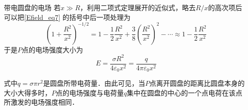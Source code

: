 \begin{example}{带电圆盘的电场}
若$x\gg R$，利用二项式定理展开的近似式，略去$R/x$的高次项后可以把\autoref{Efield_eq7} 的括号中后一项处理为
\begin{equation}
\left(1+\frac{R^{2}}{x^{2}}\right)^{-1 / 2}=1-\frac{1}{2} \frac{R^{2}}{x^{2}}+\frac{3}{8}\left(\frac{R^{2}}{x^{2}}\right)^{2}-\cdots \approx 1-\frac{1}{2} \frac{R^{2}}{x^{2}}
\end{equation}
于是$P$点的电场强度大小为
\begin{equation}
E=\frac{\sigma R^{2}}{4 \varepsilon_{0} x^{2}} =\frac{q}{4 \pi \varepsilon_{0} x^{2}} 
\end{equation}

式中$q=\sigma\pi r^2$是圆盘所带电荷量．由此可见，当$P$点离开圆盘的距离比圆盘本身的大小大得多时，$ P$点的电场强度与电荷量$q$集中在圆盘的中心的一个点电荷在该点所激发的电场强度相同．
\end{example}
